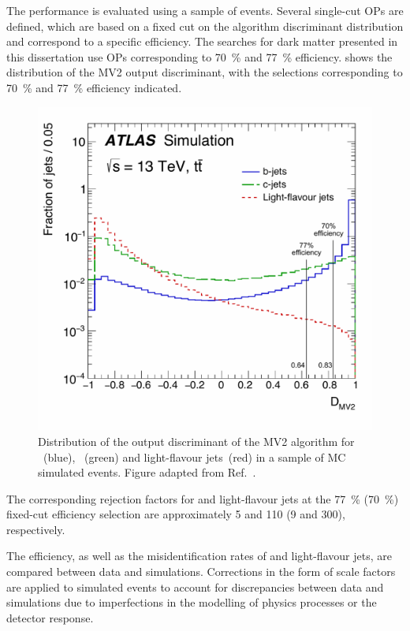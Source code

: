 The \btagging performance is evaluated using a sample of \ttbar events. Several \btagging single-cut OPs are defined, which are based on a fixed cut on the \btagging algorithm discriminant distribution and correspond to a specific \btagging efficiency. The searches for dark matter presented in this dissertation use OPs corresponding to \SI{70}{\percent} and \SI{77}{\percent} \btagging efficiency.  shows the distribution of the MV2 output discriminant, with the selections corresponding to \SI{70}{\percent} and \SI{77}{\percent} efficiency indicated.

\begin{figure}[htbp]
    \centering
    \includegraphics[width=.8\textwidth]{figures/methods/btagging_mv2.pdf}
    \caption{Distribution of the output discriminant of the MV2 \btagging algorithm for \bjets~(blue), \cjets~(green) and light-flavour jets~(red) in a sample of MC simulated \ttbar events. Figure adapted from Ref.~\cite{FTAG-2018-01}.}
    \label{fig:methods:event-reconstruction:jets:btagging:mv2}
\end{figure}

The corresponding rejection factors for \cjets and light-flavour jets at the \SI{77}{\percent} (\SI{70}{\percent}) fixed-cut efficiency selection are approximately \num{5} and \num{110} (\num{9} and \num{300}), respectively.

The \btagging efficiency, as well as the misidentification rates of \cjets and light-flavour jets, are compared between data and simulations. Corrections in the form of scale factors are applied to simulated events to account for discrepancies between data and simulations due to imperfections in the modelling of physics processes or the detector response.

